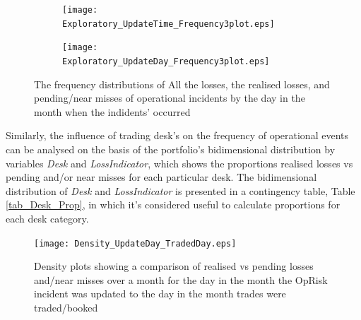 \documentclass{DissertateUSU}
\begin{document}
\singlespacing

\doublespacing

\begin{figure}
\centering
\begin{subfigure}[b]{0.55\textwidth}
   \texttt{[image: Exploratory\_UpdateTime\_Frequency3plot.eps]}
   \label{Exploratory_UpdateTime_Frequency3plot} 
\end{subfigure}

\begin{subfigure}[b]{0.55\textwidth}
   \texttt{[image: Exploratory\_UpdateDay\_Frequency3plot.eps]}
   \label{Exploratory_UpdateDay_Frequency3plot}
\end{subfigure}

\caption[Two numerical solutions: Histograms showing the distribution of UpdatedTime \& UpdatedDay by LossIndicator.]{The frequency distributions of All the losses, the realised losses, and pending/near misses of operational incidents by the day in the month when the indidents' occurred}
\label{Exploratory_Time_Day_Frequency3plot}
\end{figure}

Similarly, the influence of trading desk's on the frequency of
operational events can be analysed on the basis of the portfolio's
bidimensional distribution by variables \emph{Desk} and
\emph{LossIndicator}, which shows the proportions realised losses vs
pending and/or near misses for each particular desk. The bidimensional
distribution of \emph{Desk} and \emph{LossIndicator} is presented in a
contingency table, Table \ref{tab_Desk_Prop}, in which it's considered
useful to calculate proportions for each desk category.

\begin{figure}
\centering
\texttt{[image: Density\_UpdateDay\_TradedDay.eps]}
\caption[Density plots showing a comparison of realised vs pending losses and/near misses over a month for the day in the month the OpRisk incident was updated to the day in the month trades were traded/booked]{Density plots showing a comparison of realised vs pending losses and/near misses over a month for the day in the month the OpRisk incident was updated to the day in the month trades were traded/booked}
\label{Density_Proportions}
\end{figure}

\singlespacing
\end{document}
